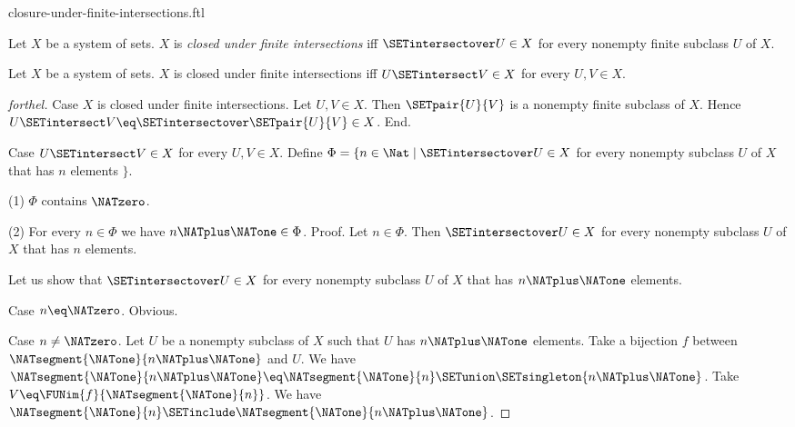 \documentclass{naproche-library}
\begin{document}
\begin{smodule}[title=Closure Under Finite Intersections]{closure-under-finite-intersections.ftl}

\begin{definition}[forthel,id=FOUNDATIONS_14_4297814324543488]
  Let $X$ be a system of sets.
  $X$ is \emph{closed under finite intersections} iff $\SETintersectover U \in X$ for every nonempty finite subclass $U$ of $X$.
\end{definition}

\begin{proposition}[forthel,id=FOUNDATIONS_17_1405012582334464]
  Let $X$ be a system of sets.
  $X$ is closed under finite intersections iff $U \SETintersect V \in X$ for every $U, V \in X$.
\end{proposition}
\begin{proof}[forthel]
  Case $X$ is closed under finite intersections.
    Let $U, V \in X$.
    Then $\SETpair{U}{V}$ is a nonempty finite subclass of $X$.
    Hence $U \SETintersect V \eq \SETintersectover \SETpair{U}{V} \in X$.
  End.

  Case $U \SETintersect V \in X$ for every $U, V \in X$.
    Define $\Phi = \{ n \in \Nat \mid \SETintersectover U \in X$ for every nonempty subclass $U$ of $X$ that has $n$ elements $\}$.

    (1) $\Phi$ contains $\NATzero$.

    (2) For every $n \in \Phi$ we have $n \NATplus \NATone \in \Phi$. \newline
    Proof.
      Let $n \in \Phi$.
      Then $\SETintersectover U \in X$ for every nonempty subclass $U$ of $X$ that has $n$ elements.

      Let us show that $\SETintersectover U \in X$ for every nonempty subclass $U$ of $X$ that has $n \NATplus \NATone$ elements.

        Case $n \eq \NATzero$. Obvious.

        Case $n \neq \NATzero$.
          Let $U$ be a nonempty subclass of $X$ such that $U$ has $n \NATplus \NATone$ elements.
          Take a bijection $f$ between $\NATsegment{\NATone}{n \NATplus \NATone}$ and $U$.
          We have $\NATsegment{\NATone}{n \NATplus \NATone} \eq \NATsegment{\NATone}{n} \SETunion \SETsingleton{n \NATplus \NATone}$.
          Take $V \eq \FUNim{f}{\NATsegment{\NATone}{n}}$.
          We have $\NATsegment{\NATone}{n} \SETinclude \NATsegment{\NATone}{n \NATplus \NATone}$.


\end{proof}
\end{smodule}
\end{document}
